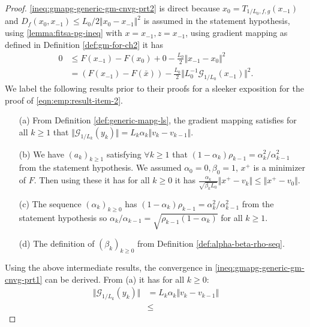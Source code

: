 \documentclass[12pt]{report}
\begin{document}
        \begin{proof}
            \eqref{ineq:gmapg-generic-gm-cnvg-prt2} is direct because $x_0 = T_{1/L_0, f, g}(x_{-1})$ and \mbox{$D_f(x_{0}, x_{-1}) \le L_0/2\Vert x_{0} - x_{-1}\Vert^2$} is assumed in the statement hypothesis, using \ref{lemma:fitsa-pg-ineq} with $x = x_{-1}, z = x_{-1}$, using  gradient mapping as defined in Definition \ref{def:gm-for-ch2} it has 
            \begin{align*}
                0 &\le F(x_{-1}) - F(x_0) + 0 - \frac{L_0}{2} \Vert x_{-1} - x_0\Vert^2
                \\
                &= (F(x_{-1}) - F(\bar x)) - \frac{L_0}{2}\Vert L_0^{-1}\mathcal G_{1/L_0}(x_{-1})\Vert^2. 
            \end{align*}
            We label the following results prior to their proofs for a sleeker exposition for the proof of \eqref{eqn:emp:result-item-2}. 
            \begin{enumerate}
                \item[(a)] From Definition \ref{def:generic-mapg-ls}, the gradient mapping satisfies for all $k \ge 1$ that $\Vert \mathcal G_{1/L_k} (y_k)\Vert = L_k\alpha_k \Vert v_k - v_{k - 1}\Vert$.
                \item[(b)] We have $(a_k)_{k \ge 1}$ satisfying $\forall k \ge 1$ that $(1 - \alpha_k)\rho_{k - 1} = \alpha_k^2/\alpha_{k - 1}^2$ from the statement hypothesis. We assumed $\alpha_0 = 0, \beta_0 = 1$, $x^+$ is a minimizer of $F$. Then using these it has for all $k \ge 0$ it has $\frac{\alpha_k}{\sqrt{\beta_k L_0}}\Vert x^+ - v_k\Vert \le \Vert x^+ - v_0\Vert$. 
                \item[(c)] The sequence $(\alpha_k)_{k \ge 0}$ has $(1 - \alpha_k)\rho_{k - 1} = \alpha_k^2/\alpha_{k - 1}^2$ from the statement hypothesis so $\alpha_k/\alpha_{k - 1} = \sqrt{\rho_{k - 1}(1 - \alpha_k)}$ for all $k \ge 1$. 
                \item[(d)] The definition of $(\beta_k)_{k \ge 0}$ from Definition \ref{def:alpha-beta-rho-seq}. 
            \end{enumerate}
            Using the above intermediate results, the convergence in \eqref{ineq:gmapg-generic-gm-cnvg-prt1} can be derived. 
            From (a) it has for all $k \ge 0$: 
            \begin{align*}
                \Vert \mathcal G_{1/L_k} (y_k)\Vert 
                &= L_k\alpha_k \Vert v_k - v_{k - 1}\Vert
                \\
                &\le 

\end{align*}
\end{proof}
\end{document}

